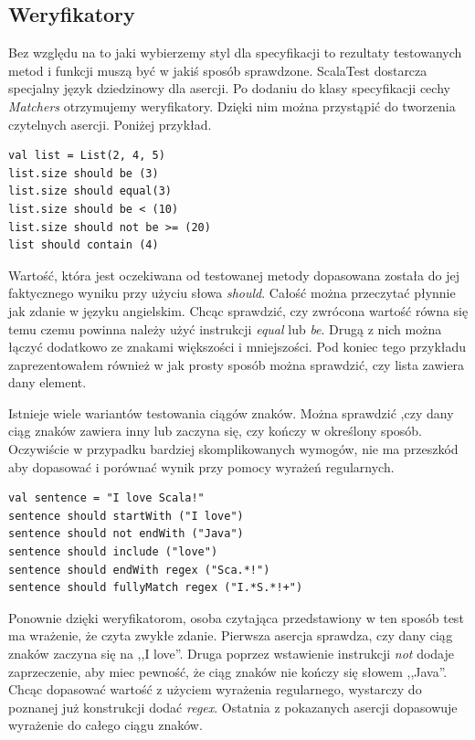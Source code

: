 \documentclass[brudnopis]{xmgr}
\begin{document}
\subsection{Weryfikatory}

\label{weryfikatory}

Bez względu na to jaki wybierzemy styl dla specyfikacji to rezultaty testowanych metod i funkcji muszą być w jakiś sposób sprawdzone. ScalaTest dostarcza specjalny język dziedzinowy dla asercji. Po dodaniu do klasy specyfikacji cechy \emph{Matchers} otrzymujemy weryfikatory. Dzięki nim można przystąpić do tworzenia czytelnych asercji. Poniżej przykład.

\begin{verbatim}
val list = List(2, 4, 5)
list.size should be (3)
list.size should equal(3)
list.size should be < (10)
list.size should not be >= (20)
list should contain (4)
\end{verbatim}

Wartość, która jest oczekiwana od testowanej metody dopasowana została do jej faktycznego wyniku przy użyciu słowa \emph{should}. Całość można przeczytać płynnie jak zdanie w języku angielskim. 
Chcąc sprawdzić, czy zwrócona wartość równa się temu czemu powinna należy użyć instrukcji \emph{equal} lub \emph{be}. Drugą z nich można łączyć dodatkowo ze znakami większości i mniejszości. Pod koniec tego przykładu zaprezentowałem również w jak prosty sposób można sprawdzić, czy lista zawiera dany element.

Istnieje wiele wariantów testowania ciągów znaków. Można sprawdzić ,czy dany ciąg znaków zawiera inny lub zaczyna się, czy kończy w określony sposób. Oczywiście w przypadku bardziej skomplikowanych wymogów, nie ma przeszkód aby dopasować i porównać wynik przy pomocy wyrażeń regularnych.

\begin{verbatim}
val sentence = "I love Scala!"
sentence should startWith ("I love")
sentence should not endWith ("Java")
sentence should include ("love")
sentence should endWith regex ("Sca.*!")
sentence should fullyMatch regex ("I.*S.*!+")
\end{verbatim}

Ponownie dzięki weryfikatorom, osoba czytająca przedstawiony w ten sposób test ma wrażenie, że czyta zwykłe zdanie. Pierwsza asercja sprawdza, czy dany ciąg znaków zaczyna się na ,,I love''. Druga poprzez wstawienie instrukcji \emph{not} dodaje zaprzeczenie, aby miec pewność, że ciąg znaków nie kończy się słowem ,,Java''. Chcąc dopasować wartość z użyciem wyrażenia regularnego, wystarczy do poznanej już konstrukcji dodać \emph{regex}. Ostatnia z pokazanych asercji dopasowuje wyrażenie do całego ciągu znaków.
\end{document}

